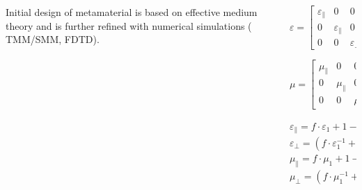 \documentclass{beamer}
\begin{document}
\begin{frame}
\begin{columns}
\begin{column}{0.5\textwidth}
\begin{figure}[htb]
			\end{figure}
		 	{\tiny Initial design of metamaterial is based on effective medium theory and is further refined with numerical simulations ( TMM/SMM, FDTD).}
		\end{column}
		 \begin{column}{0.5\textwidth}
			\[ \varepsilon= \left[ \begin{array}{ccc}
							\varepsilon_{\parallel} & 0 & 0 \\
							0 & \varepsilon_{\parallel} & 0 \\
							0 & 0 &  \varepsilon_{\perp} \end{array} \right]
			\] 		

			\[ \mu= \left[ \begin{array}{ccc}
							\mu_{\parallel} & 0 & 0 \\
							0 & \mu_{\parallel} & 0 \\
							0 & 0 &  \mu_{\perp} \end{array} \right]
			\] 		

			$\varepsilon_{\parallel}=f\cdot{\varepsilon_1}+{1-f}\cdot \varepsilon_2$\\
			$\varepsilon_{\perp}=\left(f\cdot{\varepsilon_1^{-1}}+(1-f)\cdot \varepsilon_2^{-1}\right)^{-1}$\\
			$\mu_{\parallel}=f\cdot{\mu_1}+{1-f}\cdot \mu_2$\\
			$\mu_{\perp}=\left(f\cdot{\mu_1^{-1}}+(1-f)\cdot \mu_2^{-1}\right)^{-1}$
		\end{column}
	\end{columns}
	{\tiny {\tiny  \cite{PhysRevLett.85.3966}}}
\end{frame}
\end{document}
